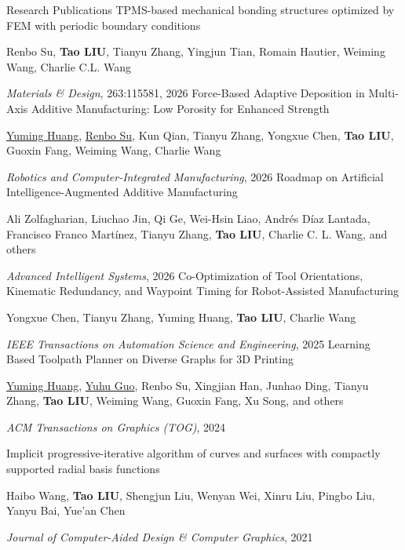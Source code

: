 \begin{rubric}{Research Publications}
\entry*[]
	[6] TPMS-based mechanical bonding structures optimized by FEM with periodic boundary conditions
	\par Renbo Su, \textbf{Tao LIU}, Tianyu Zhang, Yingjun Tian, Romain Hautier, Weiming Wang, Charlie C.L. Wang
	\par \textit{Materials \& Design}, 263:115581, 2026
%
\entry*[]
	[5] Force-Based Adaptive Deposition in Multi-Axis Additive Manufacturing: Low Porosity for Enhanced Strength
	\par \underline{Yuming Huang}, \underline{Renbo Su}, Kun Qian, Tianyu Zhang, Yongxue Chen, \textbf{Tao LIU}, Guoxin Fang, Weiming Wang, Charlie Wang
	\par \textit{Robotics and Computer-Integrated Manufacturing}, 2026
%
\entry*[]
	[4] Roadmap on Artificial Intelligence-Augmented Additive Manufacturing
	\par Ali Zolfagharian, Liuchao Jin, Qi Ge, Wei-Hsin Liao, Andrés Díaz Lantada, Francisco Franco Martínez, Tianyu Zhang, \textbf{Tao LIU}, Charlie C. L. Wang, and others
	\par \textit{Advanced Intelligent Systems}, 2026
%
\entry*[]
	[3] Co-Optimization of Tool Orientations, Kinematic Redundancy, and Waypoint Timing for Robot-Assisted Manufacturing
	\par Yongxue Chen, Tianyu Zhang, Yuming Huang, \textbf{Tao LIU}, Charlie Wang
	\par \textit{IEEE Transactions on Automation Science and Engineering}, 2025
%
\entry*[]
	[2] Learning Based Toolpath Planner on Diverse Graphs for 3D Printing
	\par \underline{Yuming Huang}, \underline{Yuhu Guo}, Renbo Su, Xingjian Han, Junhao Ding, Tianyu Zhang, \textbf{Tao LIU}, Weiming Wang, Guoxin Fang, Xu Song, and others
	\par \textit{ACM Transactions on Graphics (TOG)}, 2024


%
\entry*[]
	[1] Implicit progressive-iterative algorithm of curves and surfaces with compactly supported radial basis functions
	\par Haibo Wang, \textbf{Tao LIU}, Shengjun Liu, Wenyan Wei, Xinru Liu, Pingbo Liu, Yanyu Bai, Yue'an Chen
	\par \textit{Journal of Computer-Aided Design \& Computer Graphics}, 2021
%
\end{rubric}
